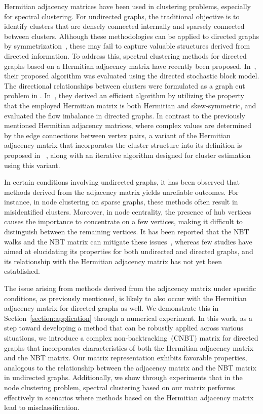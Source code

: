 \documentclass{article}
\theoremstyle{plain}
\begin{document}
Hermitian adjacency matrices have been used in clustering problems, especially for spectral clustering.
For undirected graphs, the traditional objective is to identify clusters
that are densely connected internally and sparsely connected between clusters.
Although these methodologies can be applied to directed graphs by symmetrization~\citep{Satuluri2011-ja},
these may fail to capture valuable structures derived from directed information.
To address this, spectral clustering methods for directed graphs based on a Hermitian adjacency matrix have recently been proposed.
In~\citep{Cucuringu2020-de}, their proposed algorithm was evaluated using the directed stochastic block model.
The directional relationships between clusters were formulated as a graph cut problem in \citep{Laenen2020-ft}.
In~\citep{Hayashi2022-sy}, they derived an efficient algorithm by utilizing the property that the employed Hermitian matrix is both Hermitian and skew-symmetric, and evaluated the flow imbalance in directed graphs.
In contrast to the previously mentioned Hermitian adjacency matrices, where complex values are determined by the edge connections between vertex pairs, a variant of the Hermitian adjacency matrix that incorporates the cluster structure into its definition is proposed in ~\citep{Martin2024-en}, along with an iterative algorithm designed for cluster estimation using this variant.

In certain conditions involving undirected graphs, it has been observed that methods derived from the adjacency matrix yields unreliable outcomes.
For instance, in node clustering on sparse graphs, these methods often result in misidentified clusters.
Moreover, in node centrality, the presence of hub vertices causes the importance to concentrate on a few vertices, making it difficult to distinguish between the remaining vertices.
It has been reported that the NBT walks and the NBT matrix can mitigate these issues~\citep{Krzakala2013-up,Newman2013-zc,Martin2014-tv,Arrigo2018-vi},
whereas few studies have aimed at elucidating its properties for both undirected and directed graphs,
and its relationship with the Hermitian adjacency matrix has not yet been established.

The issue arising from methods derived from the adjacency matrix under specific conditions, as previously mentioned, is likely to also occur with the Hermitian adjacency matrix for directed graphs as well.
We demonstrate this in Section~\ref{section:application} through a numerical experiment.
In this work, as a step toward developing a method that can be robustly applied across various situations,
we introduce a complex non-backtracking~(CNBT) matrix for directed graphs that incorporates characteristics of both the Hermitian adjacency matrix and the NBT matrix.
Our matrix representation exhibits favorable properties, analogous to the relationship between the adjacency matrix and the NBT matrix in undirected graphs.
Additionally, we show through experiments that in the node clustering problem, spectral clustering based on our matrix performs effectively in scenarios where methods based on the Hermitian adjacency matrix lead to misclassification.
\end{document}
